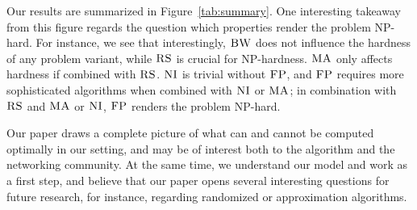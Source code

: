 \documentclass[9pt]{sigcomm-alternate}
\newcommand{\maciek}[1]{\textcolor{brown}{maciek: #1}}
\newcommand{\CC}{\textsc{NI}}
\newcommand{\FP}{\textsc{FP}}
\newcommand{\RS}{\textsc{RS}}
\newcommand{\BW}{\textsc{BW}}
\newcommand{\MA}{\textsc{MA}}
\begin{document}
Our results are summarized in
Figure~\ref{tab:summary}.
One interesting takeaway from this figure regards
the question which properties render the problem
NP-hard. For instance, we see that interestingly, $\BW$
does not influence the hardness of any problem variant,
while $\RS$ is crucial for NP-hardness.
$\MA$ only affects hardness if combined with $\RS$.
$\CC$ is trivial without $\FP$, and $\FP$ requires
more sophisticated algorithms when combined with $\CC$ or $\MA$;
in combination with $\RS$ and $\MA$ or $\CC$, $\FP$ renders the
problem NP-hard.





Our paper draws a complete picture of what can and cannot be
computed optimally in our setting, and may be of interest both to the algorithm
and the networking community. At the same time, we understand our model and work
as a first step, and believe that our paper opens several interesting
questions for future research, for instance, regarding randomized
or approximation algorithms.


%


\end{document}
